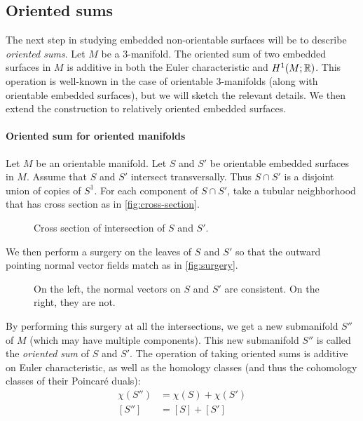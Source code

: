 \subsection{Oriented sums}
\label{sec:oriented-sums}

The next step in studying embedded non-orientable surfaces will be to describe \emph{oriented sums}.  Let $M$ be a 3-manifold.
The oriented sum of two embedded surfaces in $M$ is additive in both the Euler characteristic and $H^1(M;\mathbb{R})$.
This operation is well-known in the case of orientable $3$-manifolds (along with orientable embedded surfaces), but we will sketch the relevant details.
We then extend the construction to relatively oriented embedded surfaces.

\paragraph{Oriented sum for oriented manifolds}
Let $M$ be an orientable manifold.
Let $S$ and $S'$ be orientable embedded surfaces in $M$.
Assume that $S$ and $S'$ intersect transversally.
Thus $S \cap S'$ is a disjoint union of copies of $S^1$.
For each component of $S\cap S'$, take a tubular neighborhood that has cross section as in \autoref{fig:cross-section}.
\begin{figure}
  \centering
  \caption{Cross section of intersection of $S$ and $S'$.}
  \label{fig:cross-section}
\end{figure}



We then perform a surgery on the leaves of $S$ and $S'$ so that the outward pointing normal vector fields match as in \autoref{fig:surgery}.
\begin{figure}[b]
  \centering
  \caption{On the left, the normal vectors on $S$ and $S'$ are consistent. On the right, they are not.}
  \label{fig:surgery}
\end{figure}

By performing this surgery at all the intersections, we get a new submanifold $S''$ of $M$ (which may have multiple components).
This new submanifold $S''$ is called the {\it oriented sum} of $S$ and $S'$.
The operation of taking oriented sums is additive on Euler characteristic, as well as the homology classes (and thus the cohomology classes of their Poincar\'e duals):
\begin{align*}
  \chi(S'') &= \chi(S) + \chi(S') \\
  [S''] &= [S] + [S']
\end{align*}

